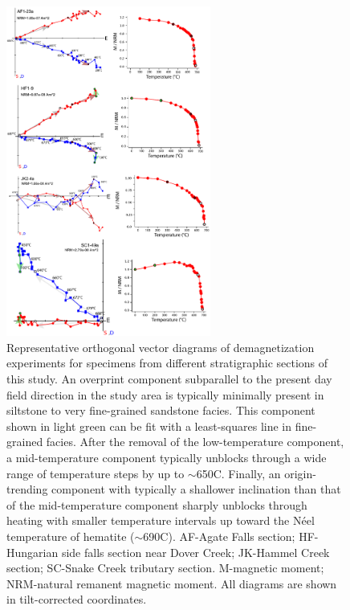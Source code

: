 \begin{figure}
\centering
\includegraphics[width=0.6\textwidth]{figure/Zhang2024a/SI_orthogonal.pdf}
\caption[Representative orthogonal vector diagrams of demagnetization experiments for specimens from different stratigraphic sections of the Jacobsville Formation]{Representative orthogonal vector diagrams of demagnetization experiments for specimens from different stratigraphic sections of this study. An overprint component subparallel to the present day field direction in the study area is typically minimally present in siltstone to very fine-grained sandstone facies. This component shown in light green can be fit with a least-squares line in fine-grained facies. After the removal of the low-temperature component, a mid-temperature component typically unblocks through a wide range of temperature steps by up to $\sim$650\textdegree C. Finally, an origin-trending component with typically a shallower inclination than that of the mid-temperature component sharply unblocks through heating with smaller temperature intervals up toward the N\'eel temperature of hematite ($\sim$690\textdegree C). AF-Agate Falls section; HF-Hungarian side falls section near Dover Creek; JK-Hammel Creek section; SC-Snake Creek tributary section. M-magnetic moment; NRM-natural remanent magnetic moment. All diagrams are shown in tilt-corrected coordinates.}
\label{fig:SI_orthogonal}
\end{figure}

